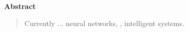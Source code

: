 \newpage
\begin{center}
 {\bf\LARGE Abstract}\vskip 1.5cm
\end{center} 
\begin{quotation}
Currently ...
\vskip 0.3cm
\hspace*{-0.6cm}{\bf Keywords:} neural networks, , intelligent systems.
\end{quotation}



